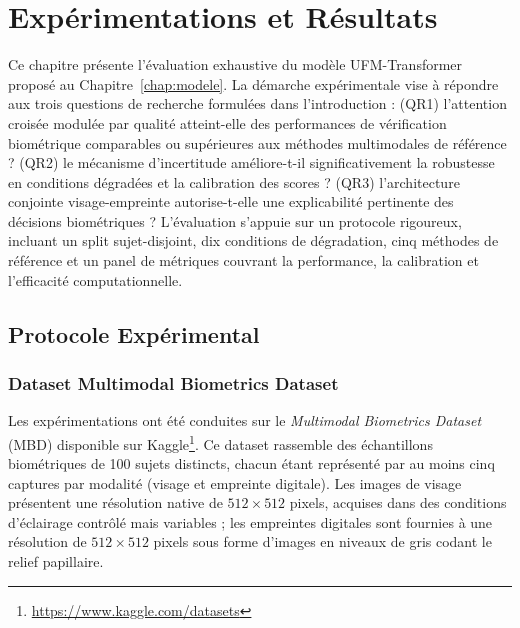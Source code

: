 \documentclass[12pt,a4paper]{report}
\begin{document}

\chapter{Exp\'{e}rimentations et R\'{e}sultats}
\label{chap:resultats}

Ce chapitre pr\'{e}sente l'\'{e}valuation exhaustive du mod\`{e}le UFM-Transformer propos\'{e} au Chapitre~\ref{chap:modele}. La d\'{e}marche exp\'{e}rimentale vise \`{a} r\'{e}pondre aux trois questions de recherche formul\'{e}es dans l'introduction : (QR1) l'attention crois\'{e}e modul\'{e}e par qualit\'{e} atteint-elle des performances de v\'{e}rification biom\'{e}trique comparables ou sup\'{e}rieures aux m\'{e}thodes multimodales de r\'{e}f\'{e}rence ? (QR2) le m\'{e}canisme d'incertitude am\'{e}liore-t-il significativement la robustesse en conditions d\'{e}grad\'{e}es et la calibration des scores ? (QR3) l'architecture conjointe visage-empreinte autorise-t-elle une explicabilit\'{e} pertinente des d\'{e}cisions biom\'{e}triques ? L'\'{e}valuation s'appuie sur un protocole rigoureux, incluant un split sujet-disjoint, dix conditions de d\'{e}gradation, cinq m\'{e}thodes de r\'{e}f\'{e}rence et un panel de m\'{e}triques couvrant la performance, la calibration et l'efficacit\'{e} computationnelle.

\section{Protocole Exp\'{e}rimental}
\label{sec:protexp}

\subsection{Dataset Multimodal Biometrics Dataset}

Les exp\'{e}rimentations ont \'{e}t\'{e} conduites sur le \textit{Multimodal Biometrics Dataset} (MBD) disponible sur Kaggle\footnote{\url{https://www.kaggle.com/datasets}}. Ce dataset rassemble des \'{e}chantillons biom\'{e}triques de 100 sujets distincts, chacun \'{e}tant repr\'{e}sent\'{e} par au moins cinq captures par modalit\'{e} (visage et empreinte digitale). Les images de visage pr\'{e}sentent une r\'{e}solution native de $512 \times 512$ pixels, acquises dans des conditions d'\'{e}clairage contr\^{o}l\'{e} mais variables ; les empreintes digitales sont fournies \`{a} une r\'{e}solution de $512 \times 512$ pixels sous forme d'images en niveaux de gris codant le relief papillaire.
\end{document}
